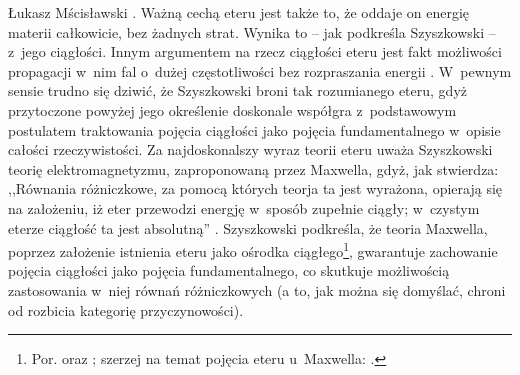 \begin{artplenv}{Łukasz Mścisławski}
{}. Ważną cechą eteru jest także to, że oddaje on energię materii całkowicie, bez żadnych strat. Wynika to -- jak podkreśla Szyszkowski -- z~jego ciągłości. Innym argumentem na rzecz ciągłości eteru jest fakt możliwości propagacji w~nim fal o~dużej częstotliwości bez rozpraszania energii 
\parencite[por.][s.~52]{szyszkowski_o_1916}. %
 W~pewnym sensie trudno się dziwić, że Szyszkowski broni tak rozumianego eteru, gdyż przytoczone powyżej jego określenie doskonale współgra z~podstawowym postulatem traktowania pojęcia ciągłości jako pojęcia fundamentalnego w~opisie całości rzeczywistości. Za najdoskonalszy wyraz teorii eteru uważa Szyszkowski teorię elektromagnetyzmu, zaproponowaną przez Maxwella, gdyż, jak stwierdza: ,,Równania różniczkowe, za pomocą których teorja ta jest wyrażona, opierają się na założeniu, iż eter przewodzi energję w~sposób zupełnie ciągły; w~czystym eterze ciągłość ta jest absolutną'' 
\parencite[][s.~51]{szyszkowski_o_1916}. %
 Szyszkowski podkreśla, że teoria Maxwella, poprzez założenie istnienia eteru jako ośrodka ciągłego\footnote{Por. 
\parencite[][]{maxwell_dynamical_1865} %
 oraz 
\parencite[][]{maxwell_ether_1878}; %
 szerzej na temat pojęcia eteru u~Maxwella: 
\parencite[][]{theocharis_maxwells_1983}.%
}, gwarantuje zachowanie pojęcia ciągłości jako pojęcia fundamentalnego, co skutkuje możliwością zastosowania w~niej równań różniczkowych (a to, jak można się domyślać, chroni od rozbicia kategorię przyczynowości).


\end{artplenv}
